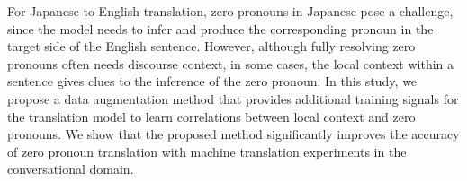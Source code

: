 For Japanese-to-English translation, zero pronouns in Japanese pose a challenge, since the model needs to infer and produce the corresponding pronoun in the target side of the English sentence.
However, although fully resolving zero pronouns often needs discourse context, in some cases, the local context within a sentence gives clues to the inference of the zero pronoun.
In this study, we propose a data augmentation method that provides additional training signals for the translation model to learn correlations between local context and zero pronouns.
We show that the proposed method significantly improves the accuracy of zero pronoun translation with machine translation experiments in the conversational domain.
